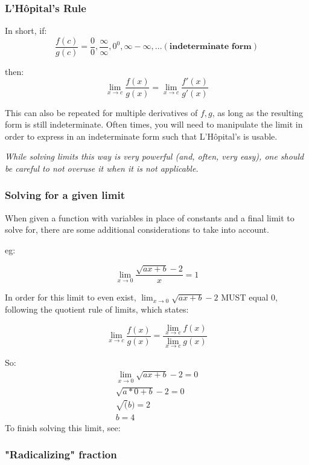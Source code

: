 \documentclass[12pt]{article}
\begin{document}
\subsubsection{L'Hôpital's Rule}

\begin{shaded}
In short, if:
$$\frac{f(c)}{g(c)} = \frac{0}{0}, \frac{\infty}{\infty}, 0^0, \infty - \infty, ... (\textbf{indeterminate form})$$ 

then:
$$\lim_{x\to c}\frac{f(x)}{g(x)} = \lim_{x\to c}\frac{f'(x)}{g'(x)}$$
\end{shaded}
This can also be repeated for multiple derivatives of $f, g$, as long as the resulting form is still indeterminate. Often times, you will need to manipulate the limit in order to express in an indeterminate form such that L'Hôpital's is usable.

\textit{While solving limits this way is very powerful (and, often, very easy), one should be careful to not overuse it when it is not applicable.}

\subsubsection{Solving for a given limit}

When given a function with variables in place of constants and a final limit to solve for, there are some additional considerations to take into account.

eg:

$$\lim_{x\to0}\frac{\sqrt{ax + b} - 2}{x} = 1$$

In order for this limit to even exist, $\lim_{x\to0} \sqrt{ax + b} - 2$ MUST equal 0, following the quotient rule of limits, which states:

$$\lim_{x\to c} \frac{f(x)}{g(x)} = \frac{\lim_{x\to c} f(x)}{\lim_{x\to c} g(x)}$$

So:
\begin{equation}
\begin{split}
    \lim_{x\to0} \sqrt{ax + b} - 2 = 0\\
    \sqrt{a*0 + b} - 2 = 0\\
    \sqrt(b) = 2\\
    b = 4
\end{split}
\end{equation}
To finish solving this limit, see:

\subsubsection{"Radicalizing" fraction}
\end{document}
